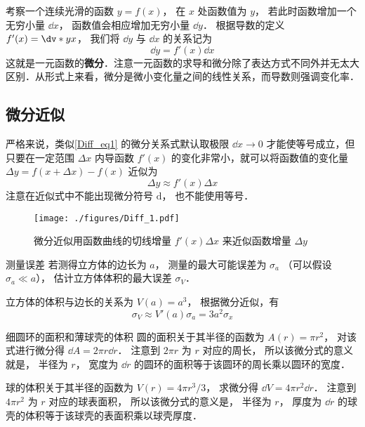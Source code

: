 
考察一个连续光滑的函数 $y = f(x)$， 在 $x$ 处函数值为 $y$， 若此时函数增加一个无穷小量 $\dd{x}$， 函数值会相应增加无穷小量 $\dd{y}$． 根据导数的定义 $f'(x) = \dv*{y}{x}$， 我们将 $\dd{y}$ 与 $\dd{x}$ 的关系记为
\begin{equation}\label{Diff_eq1}
\dd{y} = f'(x) \dd{x}
\end{equation}
这就是一元函数的\textbf{微分}．注意一元函数的求导和微分除了表达方式不同外并无太大区别．从形式上来看，微分是微小变化量之间的线性关系，而导数则强调变化率．

\subsection{微分近似}
严格来说，类似\autoref{Diff_eq1} 的微分关系式默认取极限 $\dd{x} \to 0$ 才能使等号成立，但只要在一定范围 $\Delta x$ 内导函数 $f'(x)$ 的变化非常小，就可以将函数值的变化量 $\Delta y = f(x+\Delta x)-f(x)$ 近似为
\begin{equation}\label{Diff_eq2}
\Delta y \approx f'(x) \Delta x
\end{equation}
注意在近似式中不能出现微分符号 $\mathrm{d}$， 也不能使用等号．

\begin{figure}[ht]
\centering
\texttt{[image: ./figures/Diff\_1.pdf]}
\caption{微分近似用函数曲线的切线增量 $f'(x)\Delta x$ 来近似函数增量 $\Delta y$} \label{Diff_fig1}
\end{figure}

\begin{example}{测量误差}\label{Diff_ex1}
若测得立方体的边长为 $a$， 测量的最大可能误差为 $\sigma_a$ （可以假设 $\sigma_a \ll a$）， 估计立方体体积的最大误差 $\sigma_V$．

立方体的体积与边长的关系为 $V(a)=a^3$， 根据微分近似，有
\begin{equation}
\sigma_V \approx V'(a) \sigma_a = 3a^2 \sigma_x
\end{equation}
\end{example}

\begin{example}{细圆环的面积和薄球壳的体积}\label{Diff_ex2}
圆的面积关于其半径的函数为 $A(r) = \pi r^2$， 对该式进行微分得 $\dd{A} = 2\pi r\dd{r}$． 注意到 $2\pi r$ 为 $r$ 对应的周长， 所以该微分式的意义就是， 半径为 $r$， 宽度为 $\dd{r}$ 的圆环的面积等于该圆环的周长乘以圆环的宽度．

球的体积关于其半径的函数为 $V(r) = 4\pi r^3/3$， 求微分得 $\dd{V} = 4\pi r^2 \dd{r}$． 注意到 $4\pi r^2$ 为 $r$ 对应的球表面积， 所以该微分式的意义是， 半径为 $r$， 厚度为 $\dd{r}$ 的球壳的体积等于该球壳的表面积乘以球壳厚度．
\end{example}


